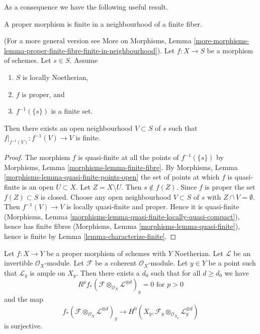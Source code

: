 \noindent
As a consequence we have the following useful result.

\begin{lemma}
\label{lemma-proper-finite-fibre-finite-in-neighbourhood}
\begin{slogan}
A proper morphism is finite in a neighbourhood of a finite fiber.
\end{slogan}
(For a more general version see
More on Morphisms,
Lemma \ref{more-morphisms-lemma-proper-finite-fibre-finite-in-neighbourhood}).
Let $f : X \to S$ be a morphism of schemes.
Let $s \in S$.
Assume
\begin{enumerate}
\item $S$ is locally Noetherian,
\item $f$ is proper, and
\item $f^{-1}(\{s\})$ is a finite set.
\end{enumerate}
Then there exists an open neighbourhood $V \subset S$ of $s$
such that $f|_{f^{-1}(V)} : f^{-1}(V) \to V$ is finite.
\end{lemma}

\begin{proof}
The morphism $f$ is quasi-finite at all the points of $f^{-1}(\{s\})$
by Morphisms, Lemma \ref{morphisms-lemma-finite-fibre}.
By Morphisms, Lemma \ref{morphisms-lemma-quasi-finite-points-open} the
set of points at which $f$ is quasi-finite is an open $U \subset X$.
Let $Z = X \setminus U$. Then $s \not \in f(Z)$. Since $f$ is proper
the set $f(Z) \subset S$ is closed. Choose any open neighbourhood
$V \subset S$ of $s$ with $Z \cap V = \emptyset$. Then
$f^{-1}(V) \to V$ is locally quasi-finite and proper.
Hence it is quasi-finite
(Morphisms, Lemma \ref{morphisms-lemma-quasi-finite-locally-quasi-compact}),
hence has finite fibres
(Morphisms, Lemma \ref{morphisms-lemma-quasi-finite}), hence
is finite by Lemma \ref{lemma-characterize-finite}.
\end{proof}

\begin{lemma}
\label{lemma-ample-on-fibre}
Let $f : X \to Y$ be a proper morphism of schemes with $Y$ Noetherian.
Let $\mathcal{L}$ be an invertible $\mathcal{O}_X$-module.
Let $\mathcal{F}$ be a coherent $\mathcal{O}_X$-module.
Let $y \in Y$ be a point such that $\mathcal{L}_y$ is ample on $X_y$.
Then there exists a $d_0$ such that for all $d \geq d_0$ we have
$$
R^pf_*(\mathcal{F} \otimes_{\mathcal{O}_X} \mathcal{L}^{\otimes d})_y = 0
\text{ for }p > 0
$$
and the map
$$
f_*(\mathcal{F} \otimes_{\mathcal{O}_X} \mathcal{L}^{\otimes d})_y
\longrightarrow
H^0(X_y, \mathcal{F}_y \otimes_{\mathcal{O}_{X_y}} \mathcal{L}_y^{\otimes d})
$$
is surjective.
\end{lemma}

